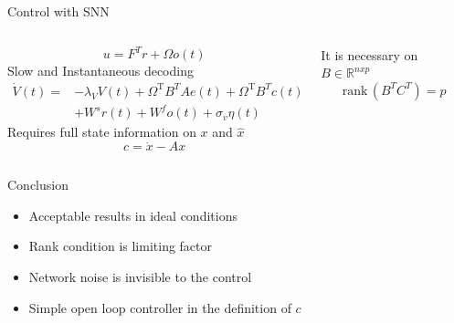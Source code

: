 \documentclass[17pt, t, lualatex]{beamer}
\newcommand{\rank}{\text{rank}\,}
\begin{document}
\begin{frame}{Control with SNN}
	\begin{columns}
		\begin{column}{0.45\textwidth}
			\begin{equation}
				u = F^T r + \Omega o(t)
			\end{equation}
			Slow and Instantaneous decoding\\
			\begin{equation}
			\begin{aligned}
			\dot{V}(t)= & -\lambda_V V(t)+\Omega^{\mathrm{T}} B^T A e(t)+\Omega^{\mathrm{T}} B^T c(t) \\
			& +W^s r(t)+W^f o(t)+\sigma_v \eta(t)
			\end{aligned}
			\end{equation}
			Requires full state information on $x$ and $\hat{x}$
			\begin{equation}
				c= \dot{x} - Ax
			\end{equation}
		\end{column}
		\begin{column}{0.45\textwidth}
			It is necessary on $B \in \mathbb{R}^{nxp}$
			\begin{equation}
				\rank(B^TC^T) = p
			\end{equation}
		\end{column}
	\end{columns}
\end{frame}


\begin{frame}{Conclusion}
	\pause
	\begin{itemize}
		\setlength\itemsep{1.5em}
		\item Acceptable results in ideal conditions
		\pause
		\item Rank condition is limiting factor
		\pause
		\item Network noise is invisible to the control
		\pause
		\item Simple open loop controller in the definition of $c$
	\end{itemize}
\end{frame}

\end{document}
